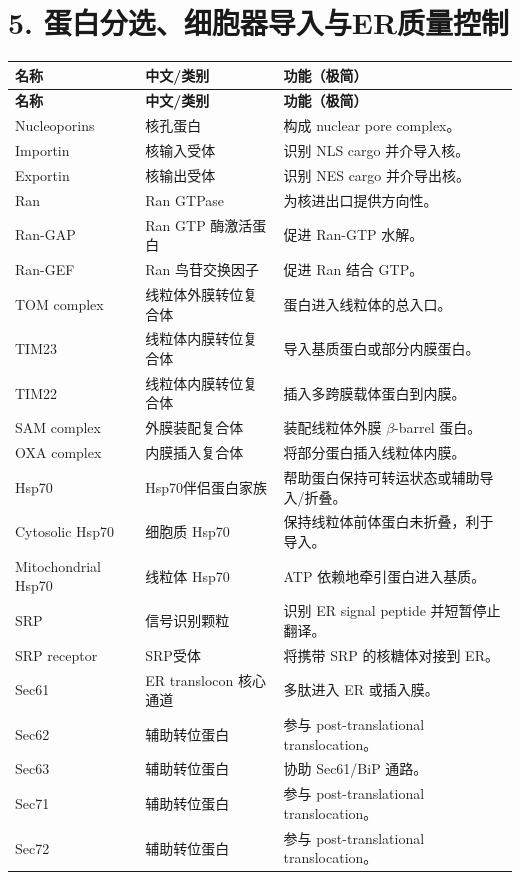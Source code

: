 \documentclass[11pt,fontset=none]{ctexart}
\begin{document}
\section*{5. 蛋白分选、细胞器导入与ER质量控制}
\begin{longtable}{L{3.2cm} L{3.8cm} L{8.5cm}}
\toprule
\textbf{名称} & \textbf{中文/类别} & \textbf{功能（极简）} \\
\midrule
\endfirsthead
\toprule
\textbf{名称} & \textbf{中文/类别} & \textbf{功能（极简）} \\
\midrule
\endhead
\bottomrule
\endfoot
Nucleoporins & 核孔蛋白 & 构成 nuclear pore complex。 \\
Importin & 核输入受体 & 识别 NLS cargo 并介导入核。 \\
Exportin & 核输出受体 & 识别 NES cargo 并介导出核。 \\
Ran & Ran GTPase & 为核进出口提供方向性。 \\
Ran-GAP & Ran GTP 酶激活蛋白 & 促进 Ran-GTP 水解。 \\
Ran-GEF & Ran 鸟苷交换因子 & 促进 Ran 结合 GTP。 \\
TOM complex & 线粒体外膜转位复合体 & 蛋白进入线粒体的总入口。 \\
TIM23 & 线粒体内膜转位复合体 & 导入基质蛋白或部分内膜蛋白。 \\
TIM22 & 线粒体内膜转位复合体 & 插入多跨膜载体蛋白到内膜。 \\
SAM complex & 外膜装配复合体 & 装配线粒体外膜 $\beta$-barrel 蛋白。 \\
OXA complex & 内膜插入复合体 & 将部分蛋白插入线粒体内膜。 \\
Hsp70 & Hsp70伴侣蛋白家族 & 帮助蛋白保持可转运状态或辅助导入/折叠。 \\
Cytosolic Hsp70 & 细胞质 Hsp70 & 保持线粒体前体蛋白未折叠，利于导入。 \\
Mitochondrial Hsp70 & 线粒体 Hsp70 & ATP 依赖地牵引蛋白进入基质。 \\
SRP & 信号识别颗粒 & 识别 ER signal peptide 并短暂停止翻译。 \\
SRP receptor & SRP受体 & 将携带 SRP 的核糖体对接到 ER。 \\
Sec61 & ER translocon 核心通道 & 多肽进入 ER 或插入膜。 \\
Sec62 & 辅助转位蛋白 & 参与 post-translational translocation。 \\
Sec63 & 辅助转位蛋白 & 协助 Sec61/BiP 通路。 \\
Sec71 & 辅助转位蛋白 & 参与 post-translational translocation。 \\
Sec72 & 辅助转位蛋白 & 参与 post-translational translocation。 \\

\end{longtable}
\end{document}
